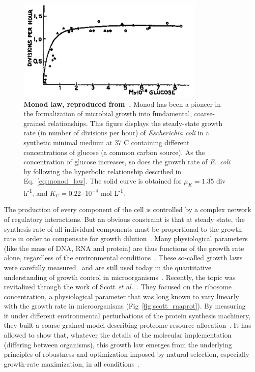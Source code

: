\begin{figure}[tb]
\centering
\includegraphics[height=5cm]{./Fig/Chapter1/monod_law}
\caption{
\textbf{Monod law, reproduced from~\cite{monod_growth_1949}.}
Monod has been a pioneer in the formalization of microbial growth into fundamental, coarse-grained relationships.
This figure displays the steady-state growth rate (in number of divisions per hour) of \textit{Escherichia coli} in a synthetic minimal medium at 37$^{\circ}$C containing different concentrations of glucose (a common carbon source).
As the concentration of glucose increases, so does the growth rate of \textit{E.~coli} by following the hyperbolic relationship described in Eq.~\ref{eq:monod_law}.
The solid curve is obtained for $\mu_K = 1.35$ div h\textsuperscript{-1}, and $K_C = 0.22 \cdot 10^{-4}$ mol L\textsuperscript{-1}.
}
\label{fig:monod_law}
\end{figure}

The production of every component of the cell is controlled by a complex network of regulatory interactions.
But an obvious constraint is that at steady state, the synthesis rate of all individual components must be proportional to the growth rate in order to compensate for growth dilution~\cite{monod_growth_1949}.
Many physiological parameters (like the mass of DNA, RNA and protein) are thus functions of the growth rate alone, regardless of the environmental conditions~\cite{schaechter_dependency_1958,bremer_modulation_1996}.
These so-called growth laws were carefully measured~\cite{bremer_modulation_1996} and are still used today in the quantitative understanding of growth control in microorganisms~\cite{ehrenberg_mediumdependent_2012}.
Recently, the topic was revitalized through the work of Scott \textit{et al.}~\cite{scott_bacterial_2011}.
They focused on the ribosome concentration, a physiological parameter that was long known to vary linearly with the growth rate in microorganisms (Fig~\ref{fig:scott_rnaprot}).
By measuring it under different environmental perturbations of the protein synthesis machinery, they built a coarse-grained model describing proteome resource allocation~\cite{scott_emergence_2014}.
It has allowed to show that, whatever the details of the molecular implementation (differing between organisms), this growth law emerges from the underlying principles of robustness and optimization imposed by natural selection, especially growth-rate maximization, in all conditions~\cite{scott_emergence_2014}.


